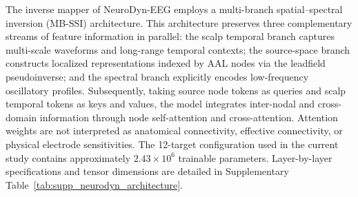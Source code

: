 \documentclass[11pt]{article}
\begin{document}
The inverse mapper of NeuroDyn-EEG employs a multi-branch spatial--spectral inversion (MB-SSI) architecture. This architecture preserves three complementary streams of feature information in parallel: the scalp temporal branch captures multi-scale waveforms and long-range temporal contexts; the source-space branch constructs localized representations indexed by AAL nodes via the leadfield pseudoinverse; and the spectral branch explicitly encodes low-frequency oscillatory profiles. Subsequently, taking source node tokens as queries and scalp temporal tokens as keys and values, the model integrates inter-nodal and cross-domain information through node self-attention and cross-attention. Attention weights are not interpreted as anatomical connectivity, effective connectivity, or physical electrode sensitivities. The 12-target configuration used in the current study contains approximately $2.43\times10^6$ trainable parameters. Layer-by-layer specifications and tensor dimensions are detailed in Supplementary Table~\ref{tab:supp_neurodyn_architecture}.
\end{document}

